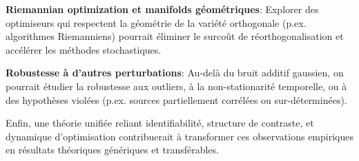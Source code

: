 \documentclass[11pt,a4paper]{article}
\begin{document}
\textbf{Riemannian optimization et manifolds géométriques}: Explorer des optimiseurs qui respectent la géométrie de la variété orthogonale (p.ex. algorithmes Riemanniens) pourrait éliminer le surcoût de réorthogonalisation et accélérer les méthodes stochastiques.

\textbf{Robustesse à d'autres perturbations}: Au-delà du bruit additif gaussien, on pourrait étudier la robustesse aux outliers, à la non-stationarité temporelle, ou à des hypothèses violées (p.ex. sources partiellement corrélées ou sur-déterminées).

Enfin, une théorie unifiée reliant identifiabilité, structure de contraste, et dynamique d'optimisation contribuerait à transformer ces observations empiriques en résultats théoriques génériques et transférables.



\end{document}
